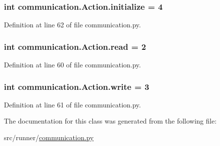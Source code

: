 \subsubsection[{initialize}]{\setlength{\rightskip}{0pt plus 5cm}int communication.\+Action.\+initialize = 4\hspace{0.3cm}{\ttfamily [static]}}\label{classcommunication_1_1Action_a605707caa83cf70de9a83822a7d9b557}


Definition at line 62 of file communication.\+py.

\hypertarget{classcommunication_1_1Action_aad179f16299ae6a705d69f2796e5719b}{}
\subsubsection[{read}]{\setlength{\rightskip}{0pt plus 5cm}int communication.\+Action.\+read = 2\hspace{0.3cm}{\ttfamily [static]}}\label{classcommunication_1_1Action_aad179f16299ae6a705d69f2796e5719b}


Definition at line 60 of file communication.\+py.

\hypertarget{classcommunication_1_1Action_a026d0f117b06558a3a5a91aeffdd1755}{}
\subsubsection[{write}]{\setlength{\rightskip}{0pt plus 5cm}int communication.\+Action.\+write = 3\hspace{0.3cm}{\ttfamily [static]}}\label{classcommunication_1_1Action_a026d0f117b06558a3a5a91aeffdd1755}


Definition at line 61 of file communication.\+py.



The documentation for this class was generated from the following file\+:\begin{DoxyCompactItemize}
\item 
src/runner/\hyperlink{communication_8py}{communication.\+py}\end{DoxyCompactItemize}

